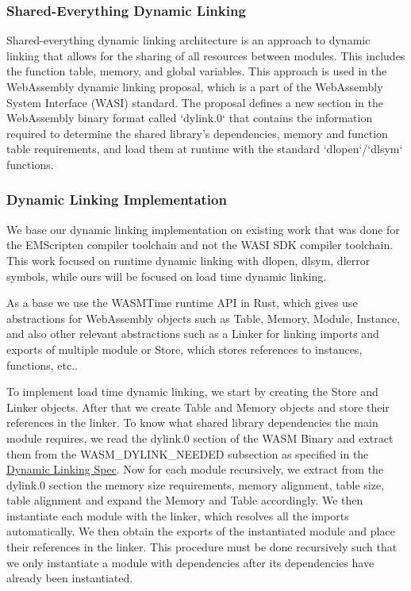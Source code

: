 \subsubsection{Shared-Everything Dynamic Linking}

Shared-everything dynamic linking architecture is an approach to dynamic linking that allows for the sharing of all resources between modules. This includes the function table, memory, and global variables. This approach is used in the WebAssembly dynamic linking proposal, which is a part of the WebAssembly System Interface (WASI) standard. The proposal defines a new section in the WebAssembly binary format called `dylink.0` that contains the information required to determine the shared library's dependencies, memory and function table requirements, and load them at runtime with the standard `dlopen`/`dlsym` functions.


\subsubsection{Dynamic Linking Implementation}

We base our dynamic linking implementation on existing work \cite{makitalo2021bringing} that was done for the EMScripten compiler toolchain and not the WASI SDK compiler toolchain. This work focused on runtime dynamic linking with dlopen, dlsym, dlerror symbols, while ours will be focused on load time dynamic linking.

As a base we use the WASMTime runtime API in Rust, which gives use abstractions for WebAssembly objects such as Table, Memory, Module, Instance, and also other relevant abstractions such as a Linker for linking imports and exports of multiple module or Store, which stores references to instances, functions, etc..

To implement load time dynamic linking, we start by creating the Store and Linker objects. After that we create Table and Memory objects and store their references in the linker. To know what shared library dependencies the main module requires, we read the dylink.0 section of the WASM Binary and extract them from the WASM\_DYLINK\_NEEDED subsection as specified in the \href{https://github.com/WebAssembly/tool-conventions/blob/main/DynamicLinking.md}{Dynamic Linking Spec}. Now for each module recursively, we extract from the dylink.0 section the memory size requirements, memory alignment, table size, table alignment and expand the Memory and Table accordingly. We then instantiate each module with the linker, which resolves all the imports automatically. We then obtain the exports of the instantiated module and place their references in the linker. This procedure must be done recursively such that we only instantiate a module with dependencies after its dependencies have already been instantiated.

